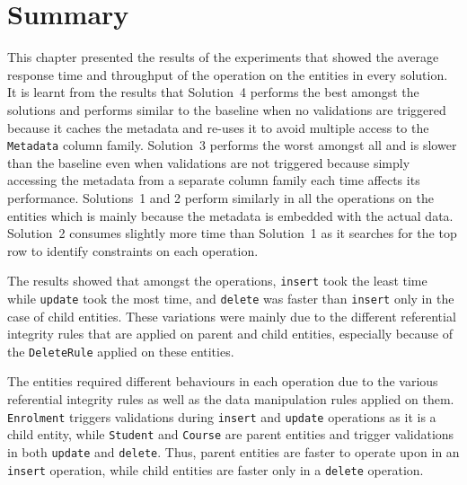 \section{Summary} \label{s:results-summary}

This chapter presented the results of the experiments that showed the average
response time and throughput of the operation on the entities in every solution.
 It is learnt from the results that Solution~4 performs the best amongst the
solutions and performs similar to the baseline when no validations are
triggered because it caches the metadata and re-uses it to avoid multiple
access to the \texttt{Metadata} column family.
Solution~3 performs the worst amongst all and is slower than the baseline even
when validations are not triggered because simply accessing the metadata from a
separate column family each time affects its performance.
Solutions~1 and 2 perform similarly in all the operations on the entities which
is mainly because the metadata is embedded with the actual data.  Solution~2
consumes slightly more time than Solution~1 as it searches for the top row to
identify constraints on each operation.

The results showed that amongst the operations,  \texttt{insert} took the least
time while \texttt{update} took the most time,  and \texttt{delete} was faster
than \texttt{insert} only in the case of child entities.  These variations were
mainly due to the different referential integrity rules that are applied on
parent and child entities,  especially because of the \texttt{DeleteRule}
applied on these entities. 

The entities required different behaviours in each operation due to the various
referential integrity rules as well as  the data manipulation rules applied on
them. 
\texttt{Enrolment} triggers validations during \texttt{insert}
 and \texttt{update} operations as it is a child entity,  while
\texttt{Student} and \texttt{Course} are parent entities and trigger validations in both
\texttt{update} and \texttt{delete}.  Thus,  parent entities are faster to operate
upon in an \texttt{insert} operation,  while child entities are faster only in a
\texttt{delete} operation.  
	
